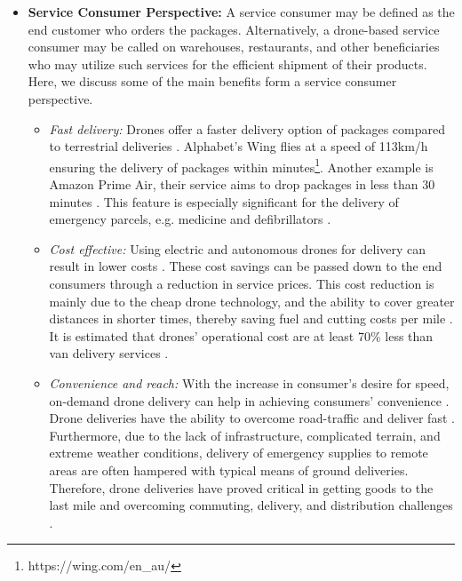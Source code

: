 \documentclass[conference]{IEEEtran}
\begin{document}
\begin{itemize}[leftmargin=*]
    \item \textbf{Service Consumer Perspective:} A service consumer may be defined as the end customer who orders the packages. Alternatively, a drone-based service consumer may be called on warehouses, restaurants, and other beneficiaries who may utilize such services for the efficient shipment of their products. Here, we discuss some of the main benefits form a service consumer perspective.
    \begin{itemize}
        \item \textit{Fast delivery:} Drones offer a faster delivery option of packages compared to terrestrial deliveries \cite{yoo2018drone}. Alphabet's Wing flies at a speed of 113km/h ensuring the delivery of packages within minutes\footnote{https://wing.com/en\_au/}. Another example is Amazon Prime Air, their service aims to drop packages in less than 30 minutes \cite{sudbury2016cost}. This feature is especially significant for the delivery of emergency parcels, e.g. medicine and defibrillators \cite{mermiri2020drones}.
        
        \item \textit{Cost effective:} Using electric and autonomous drones for delivery can result in lower costs \cite{chiang2019impact}. These cost savings can be passed down to the end consumers through a reduction in service prices. This cost reduction is mainly due to the cheap drone technology, and the ability to cover greater distances in shorter times, thereby saving fuel and cutting costs per mile \cite{chiang2019impact}. It is estimated that drones' operational cost are at least 70\% less than van delivery services \cite{goasduff2020flying}.
        \item \textit{Convenience and reach:} With the increase in consumer's desire for speed, on-demand drone delivery can help in achieving consumers' convenience \cite{yoo2018study}. Drone deliveries have the ability to overcome road-traffic and deliver fast \cite{yoo2018drone}. Furthermore, due to the lack of infrastructure, complicated terrain, and extreme weather conditions, delivery of emergency supplies to remote areas are often hampered with typical means of ground deliveries. Therefore, drone deliveries have proved critical in getting goods to the last mile and overcoming commuting, delivery, and distribution challenges \cite{salama2020joint}.
        

\end{itemize}
\end{itemize}
\end{document}
